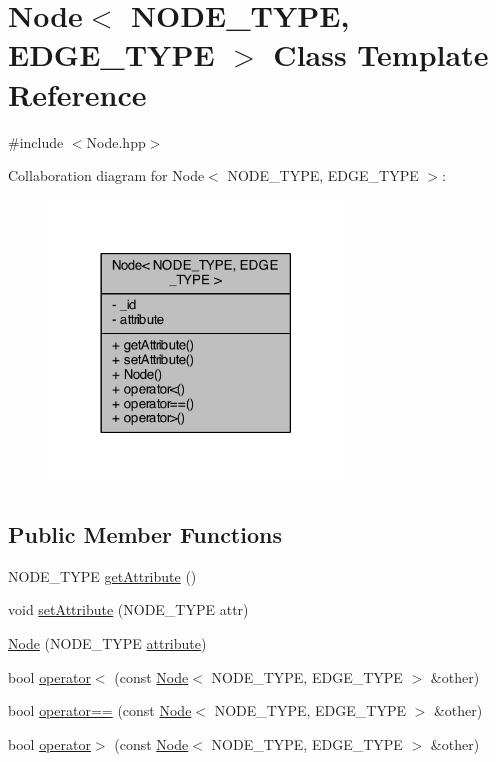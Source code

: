\hypertarget{class_node}{\section{Node$<$ N\+O\+D\+E\+\_\+\+T\+Y\+P\+E, E\+D\+G\+E\+\_\+\+T\+Y\+P\+E $>$ Class Template Reference}
\label{class_node}
}


{\ttfamily \#include $<$Node.\+hpp$>$}



Collaboration diagram for Node$<$ N\+O\+D\+E\+\_\+\+T\+Y\+P\+E, E\+D\+G\+E\+\_\+\+T\+Y\+P\+E $>$\+:
\nopagebreak
\begin{figure}[H]
\begin{center}
\leavevmode
\includegraphics[width=222pt]{class_node__coll__graph}
\end{center}
\end{figure}
\subsection*{Public Member Functions}
\begin{DoxyCompactItemize}
\item 
N\+O\+D\+E\+\_\+\+T\+Y\+P\+E \hyperlink{class_node_a1272270025389e601164431b42ab5237}{get\+Attribute} ()
\item 
void \hyperlink{class_node_acb8f913ce2f995a6a14b9b05c60938f8}{set\+Attribute} (N\+O\+D\+E\+\_\+\+T\+Y\+P\+E attr)
\item 
\hyperlink{class_node_a94263af6c10cc9882d33918080dc722f}{Node} (N\+O\+D\+E\+\_\+\+T\+Y\+P\+E \hyperlink{class_node_a434cad0f70931bc3aaa048d52d0b0ee3}{attribute})
\item 
bool \hyperlink{class_node_a81e297dd17c704ae72bf1899dbcfcfeb}{operator$<$} (const \hyperlink{class_node}{Node}$<$ N\+O\+D\+E\+\_\+\+T\+Y\+P\+E, E\+D\+G\+E\+\_\+\+T\+Y\+P\+E $>$ \&other)
\item 
bool \hyperlink{class_node_aeafeb0e9528fa394a5b8fca4d30070dd}{operator==} (const \hyperlink{class_node}{Node}$<$ N\+O\+D\+E\+\_\+\+T\+Y\+P\+E, E\+D\+G\+E\+\_\+\+T\+Y\+P\+E $>$ \&other)
\item 
bool \hyperlink{class_node_aa9d5b3e98302e3238ef5fc92eb559a81}{operator$>$} (const \hyperlink{class_node}{Node}$<$ N\+O\+D\+E\+\_\+\+T\+Y\+P\+E, E\+D\+G\+E\+\_\+\+T\+Y\+P\+E $>$ \&other)
\end{DoxyCompactItemize}

